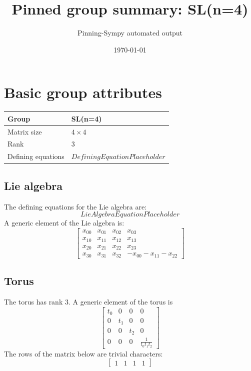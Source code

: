 \documentclass[11pt]{article}
\title{Pinned group summary: SL(n=4)}
\author{Pinning-Sympy automated output}
\date{\today}
\theoremstyle{definition}
\begin{document}
\maketitle
\tableofcontents

\newpage

\section{Basic group attributes}

\begin{tabular}{|l|l|}
	\hline
    Group & SL(n=4) \\
	\hline
    Matrix size & $4 \times 4$ \\
	\hline
    Rank & $3$ \\
	\hline
	Defining equations & $DefiningEquationPlaceholder$ \\
	\hline
\end{tabular}



\subsection{Lie algebra}

The defining equations for the Lie algebra are:
\[
LieAlgebraEquationPlaceholder
\]
A generic element of the Lie algebra is:
\[
\left[\begin{matrix}x_{0 0} & x_{0 1} & x_{0 2} & x_{0 3}\\x_{1 0} & x_{1 1} & x_{1 2} & x_{1 3}\\x_{2 0} & x_{2 1} & x_{2 2} & x_{2 3}\\x_{3 0} & x_{3 1} & x_{3 2} & - x_{0 0} - x_{1 1} - x_{2 2}\end{matrix}\right]
\]

\subsection{Torus}

The torus has rank $3$. A generic element of the torus is
\[
\left[\begin{matrix}t_{0} & 0 & 0 & 0\\0 & t_{1} & 0 & 0\\0 & 0 & t_{2} & 0\\0 & 0 & 0 & \frac{1}{t_{0} t_{1} t_{2}}\end{matrix}\right]
\]
The rows of the matrix below are trivial characters:
\[
\left[\begin{matrix}1 & 1 & 1 & 1\end{matrix}\right]
\]
\end{document}
